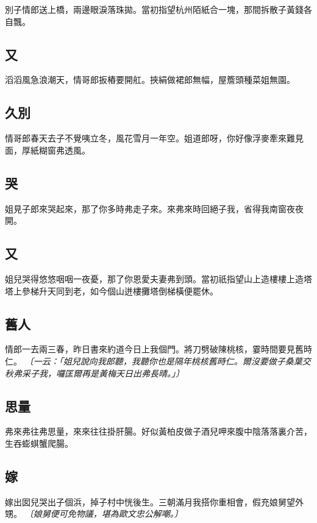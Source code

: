 別子情郎送上橋，兩邊眼淚落珠拋。當初指望杭州陌紙合一塊，那間拆散子黃錢各自飄。

\subsection*{又}

滔滔風急浪潮天，情哥郎扳樁要開舡。挾絹做裙郎無幅，屋簷頭種菜姐無園。

\subsection*{久別}

情哥郎春天去子不覺咦立冬，風花雪月一年空。姐道郎呀，你好像浮麥牽來難見面，厚紙糊窗弗透風。

\subsection*{哭}

姐見子郎來哭起來，那了你多時弗走子來。來弗來時回絕子我，省得我南窗夜夜開。

\subsection*{又}

姐兒哭得悠悠咽咽一夜憂，那了你恩愛夫妻弗到頭。當初祇指望山上造樓樓上造塔塔上參梯升天同到老，如今個山迸樓攤塔倒梯橫便罷休。

\subsection*{舊人}

情郎一去兩三春，昨日書來約道今日上我個門。將刀劈破陳桃核，霎時間要見舊時仁。
\textit{〔一云：「姐兒說向我郎聽，我聽你也是隔年桃核舊時仁。爾沒要做子桑葉交秋弗采子我，囉匡爾再是黃梅天日出弗長晴。」〕}

\subsection*{思量}

弗來弗往弗思量，來來往往掛肝腸。好似黃柏皮做子酒兒呷來腹中陰落落裏介苦，生吞蟛蜞蟹爬腸。

\subsection*{嫁}

嫁出囡兒哭出子個浜，掉子村中恍後生。三朝滿月我搭你重相會，假充娘舅望外甥。
\textit{〔娘舅便可免物議，堪為歐文忠公解嘲。〕}

